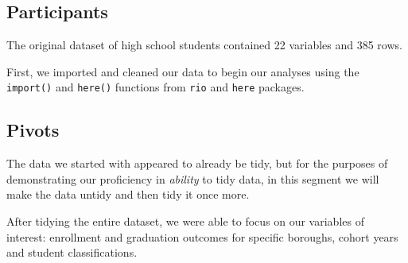 \documentclass[
  english,
  man, fleqn, noextraspace]{apa6}
\newenvironment{Shaded}{\begin{snugshade}}{\end{snugshade}}
\newcommand{\DataTypeTok}[1]{\textcolor[rgb]{0.13,0.29,0.53}{#1}}
\newcommand{\DecValTok}[1]{\textcolor[rgb]{0.00,0.00,0.81}{#1}}
\newcommand{\KeywordTok}[1]{\textcolor[rgb]{0.13,0.29,0.53}{\textbf{#1}}}
\newcommand{\NormalTok}[1]{#1}
\newcommand{\OperatorTok}[1]{\textcolor[rgb]{0.81,0.36,0.00}{\textbf{#1}}}
\newcommand{\OtherTok}[1]{\textcolor[rgb]{0.56,0.35,0.01}{#1}}
\newcommand{\StringTok}[1]{\textcolor[rgb]{0.31,0.60,0.02}{#1}}
\begin{document}
\hypertarget{participants}{%
\subsection{Participants}\label{participants}}

The original dataset of high school students contained 22 variables and 385 rows.

First, we imported and cleaned our data to begin our analyses using the \texttt{import()} and \texttt{here()} functions from \texttt{rio} and \texttt{here} packages.

\hypertarget{pivots}{%
\subsection{Pivots}\label{pivots}}

The data we started with appeared to already be tidy, but for the purposes of demonstrating our proficiency in \emph{ability} to tidy data, in this segment we will make the data untidy and then tidy it once more.

\begin{Shaded}
\end{Shaded}

After tidying the entire dataset, we were able to focus on our variables of interest: enrollment and graduation outcomes for specific boroughs, cohort years and student classifications.
\end{document}
